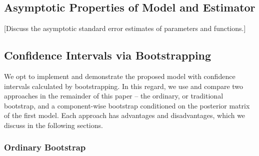 \documentclass[10pt]{olplainarticle}\usepackage[]{graphicx}\usepackage[]{color}
\DeclareMathOperator*{\argmin}{argmin}
\begin{document}

\subsection{Asymptotic Properties of Model and Estimator}

[Discuss the asymptotic standard error estimates of parameters and functions.]


\subsection{Confidence Intervals via Bootstrapping}

We opt to implement and demonstrate the proposed model with confidence intervals calculated by bootstrapping. In this regard, we use and compare two approaches in the remainder of this paper -- the ordinary, or traditional bootstrap, and a component-wise bootstrap conditioned on the posterior matrix of the first model. Each approach has advantages and disadvantages, which we discuss in the following sections.

\subsubsection{Ordinary Bootstrap}
\end{document}
